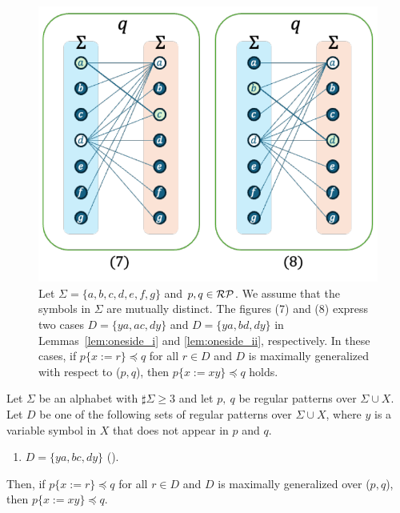 \begin{figure}[t]
  \begin{center}
    \includegraphics[scale=0.525]{figs/lem6bigraph.pdf}
    \caption{Let $\Sigma=\{a,b,c,d,e,f,g\}$ and $p,q \in \mathcal{RP}$. We assume that the symbols in $\Sigma$ are mutually distinct.
    The figures (7) and (8) express two cases $D = \{ ya, ac, dy \}$ and $D = \{ ya, bd, dy \}$ in Lemmas~\ref{lem:oneside_i} and \ref{lem:oneside_ii}, respectively.
    In these cases, if $p \{ x := r \} \preceq q$ for all $r \in D$ and $D$ is maximally generalized {\color{red}with respect to} ($p,q$), then $p \{ x := xy \} \preceq q$ holds.}\label{fig:lem6bigraph}
  \end{center}
\end{figure}

\begin{lem}\label{lem:oneside_ii}
  Let $\Sigma$ be an alphabet with $\sharp\Sigma \ge 3$ and let $p,~q$ be regular patterns {\color{red}over} $\Sigma\cup X$.
  Let $D$ be one of the following sets of regular patterns {\color{red}over} $\Sigma\cup X$, where $y$ is a variable symbol in $X$ that does not appear in $p$ and $q$.
  \begin{enumerate}
  \item[] $D=\{ ya, bc, dy \}$ (\TheConditionC).
  \end{enumerate}
  Then, if $p \{ x := r \} \preceq q$ for all $r \in D$ and $D$ is maximally generalized {\color{red}over} ($p,q$), then $p \{ x := xy \} \preceq q$.
\end{lem}

